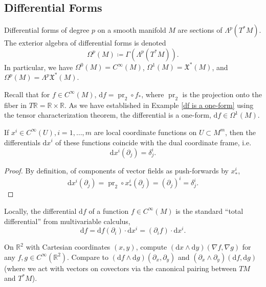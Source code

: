 \documentclass[english,letterpaper]{article}%
\numberwithin{equation}{section}
\numberwithin{figure}{section}
\numberwithin{table}{section}
\theoremstyle{definition}
\theoremstyle{definition}
\theoremstyle{definition}
\theoremstyle{plain}
\theoremstyle{plain}
\theoremstyle{plain}
\theoremstyle{plain}
\theoremstyle{remark}
\theoremstyle{remark}
\newcommand{\dd}{{\mathrm{d}}}
\DeclareMathOperator{\pr}{pr}
\newcommand{\fX}{\mathfrak{X}}
\begin{document}
\subsection{Differential Forms}


\begin{defn}
Differential forms of degree $p$ on a smooth manifold $M$ are sections of $\Lambda^p (T^\ast M)$. The exterior algebra of differential forms is denoted
\[\Omega^p(M)\coloneqq \Gamma(\Lambda^p(T^\ast M)).\]
In particular, we have $\Omega^0(M)=C^\infty(M)$, $\Omega^1(M)=\fX^\ast (M)$, and $\Omega^p(M)=\Lambda^p \fX^\ast(M).$
\end{defn}

Recall that for $f\in C^\infty(M)$, $\dd f=\pr_2\circ f_\ast$, where $\pr_2$ is the projection onto the fiber in $T\mathbb{R}=\mathbb{R}\times\mathbb{R}$. As we have established in Example \ref{df is a one-form} using the tensor characterization theorem, the differential is a one-form, $\dd f\in\Omega^1(M)$.

\begin{prop}
If $x^i\in C^\infty(U),i=1,\ldots,m$ are local coordinate functions on $U\subset M^m$, then the differentials $\dd x^i$ of these functions coincide with the dual coordinate frame, i.e.
\[\dd x^i(\partial_j)=\delta^i_j.\]
\end{prop}
\begin{proof}
By definition, of components of vector fields as push-forwards by $x^i_\ast$,
\[\dd x^i(\partial_{j})=\pr_2\circ x^i_\ast (\partial_{j})=(\partial_j)^i=\delta^i_j.\]
\end{proof}
\begin{cor}
Locally, the differential $\dd f$ of a function $f\in C^\infty(M)$ is the standard ``total differential'' from multivariable calculus, \[\dd f=\dd f(\partial_i)\cdot\dd x^i=(\partial_i f)\cdot \dd x^i.\]
\end{cor}

\begin{xca}
    On $\mathbb{R}^2$ with Cartesian coordinates $(x,y)$, compute $(\dd x\wedge \dd y)(\nabla f,\nabla g)$ for any $f,g\in C^\infty(\mathbb{R}^2)$. Compare to $(\dd f\wedge \dd g)(\partial_x,\partial_y)$ and $(\partial_x\wedge\partial_y)(\dd f,\dd g)$ (where we act with vectors on covectors via the canonical pairing between $TM$ and $T^\ast M$).
\end{xca}
\end{document}
